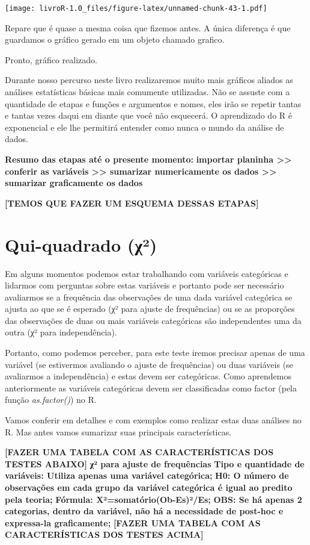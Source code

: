 \documentclass[]{book}
\begin{document}
\texttt{[image: livroR-1.0\_files/figure-latex/unnamed-chunk-43-1.pdf]}

Repare que é quase a mesma coisa que fizemos antes. A única diferença é que guardamos o gráfico gerado em um objeto chamado grafico.

Pronto, gráfico realizado.

Durante nosso percurso neste livro realizaremos muito mais gráficos aliados as análises estatísticas básicas mais comumente utilizadas. Não se assuste com a quantidade de etapas e funções e argumentos e nomes, eles irão se repetir tantas e tantas vezes daqui em diante que você não esquecerá. O aprendizado do R é exponencial e ele lhe permitirá entender como nunca o mundo da análise de dados.

\textbf{Resumo das etapas até o presente momento:}
\textbf{importar planinha \textgreater{}\textgreater{} conferir as variáveis \textgreater{}\textgreater{} sumarizar numericamente os dados \textgreater{}\textgreater{} sumarizar graficamente os dados}

\textbf{{[}TEMOS QUE FAZER UM ESQUEMA DESSAS ETAPAS{]}}

\hypertarget{qui-quadrado-ux3c7}{%
\chapter{Qui-quadrado (χ²)}\label{qui-quadrado-ux3c7}}

Em alguns momentos podemos estar trabalhando com variáveis categóricas e lidarmos com perguntas sobre estas variáveis e portanto pode ser necessário avaliarmos se a frequência das observações de uma dada variável categórica se ajusta ao que se é esperado (χ² para ajuste de frequências) ou se as proporções das observações de duas ou mais variáveis categóricas são independentes uma da outra (χ² para independência).

Portanto, como podemos perceber, para este teste iremos precisar apenas de uma variável (se estivermos avaliando o ajuste de frequências) ou duas variáveis (se avaliarmos a independência) e estas devem ser categóricas. Como aprendemos anteriormente as variáveis categóricas devem ser classificadas como factor (pela função \emph{as.factor()}) no R.

Vamos conferir em detalhes e com exemplos como realizar estas duas análises no R. Mas antes vamos sumarizar suas principais características.

\textbf{{[}FAZER UMA TABELA COM AS CARACTERÍSTICAS DOS TESTES ABAIXO{]}}
\textbf{χ² para ajuste de frequências}
\textbf{Tipo e quantidade de variáveis: Utiliza apenas uma variável categórica;}
\textbf{H0: O número de observações em cada grupo da variável categórica é igual ao predito pela teoria;}
\textbf{Fórmula: X²=somatório(Ob-Es)²/Es;}
\textbf{OBS: Se há apenas 2 categorias, dentro da variável, não há a necessidade de post-hoc e expressa-la graficamente;}
\textbf{{[}FAZER UMA TABELA COM AS CARACTERÍSTICAS DOS TESTES ACIMA{]}}
\end{document}
